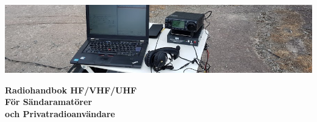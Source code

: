 \newcommand{\TitleText}{Radiohandbok HF/VHF/UHF}
\newcommand{\SubtitleText}{För Sändaramatörer\\ och Privatradioanvändare}
\newcommand{\Forfattare}{Täpp-Anders Sikvall}
\newcommand{\Initialer}{SMØUEI}
\newcommand{\DokYear}{19}
\newcommand{\DokVersion}{RC-2.0.0}
\newcommand{\DokumentRevision}{x.y.z}
\newcommand{\DokumentDatum}{\today}


\renewcommand{\arraystretch}{1.15}

\titlefoottrue %



	

\pagestyle{empty}
\vfill
\vspace*{4cm}
\centerline{\includegraphics[width=\paperwidth]{logo/rubrikbild}}
\begin{flushright}
	\Huge{\bfseries{\TitleText}} \\[3mm]
	\Large{\bfseries{\SubtitleText}}
\end{flushright}

\vfill


